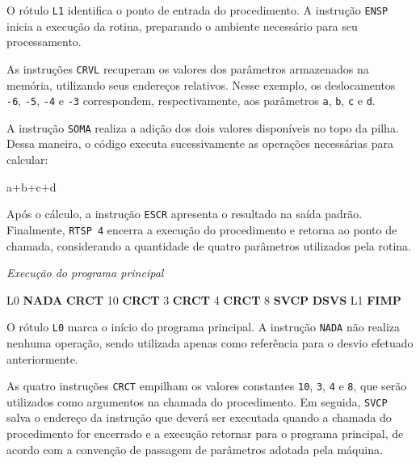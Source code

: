 \documentclass[
  brazilian,
  letterpaper,
]{book}
\newenvironment{Shaded}{\begin{snugshade}}{\end{snugshade}}
\newcommand{\DecValTok}[1]{\textcolor[rgb]{0.68,0.00,0.00}{#1}}
\newcommand{\FunctionTok}[1]{\textcolor[rgb]{0.28,0.35,0.67}{#1}}
\newcommand{\KeywordTok}[1]{\textcolor[rgb]{0.00,0.23,0.31}{\textbf{#1}}}
\newcommand{\NormalTok}[1]{\textcolor[rgb]{0.00,0.23,0.31}{#1}}
\theoremstyle{plain}
\theoremstyle{definition}
\theoremstyle{remark}
\begin{document}
O rótulo \texttt{L1} identifica o ponto de entrada do procedimento. A
instrução \texttt{ENSP} inicia a execução da rotina, preparando o
ambiente necessário para seu processamento.

As instruções \texttt{CRVL} recuperam os valores dos parâmetros
armazenados na memória, utilizando seus endereços relativos. Nesse
exemplo, os deslocamentos \texttt{-6}, \texttt{-5}, \texttt{-4} e
\texttt{-3} correspondem, respectivamente, aos parâmetros \texttt{a},
\texttt{b}, \texttt{c} e \texttt{d}.

A instrução \texttt{SOMA} realiza a adição dos dois valores disponíveis
no topo da pilha. Dessa maneira, o código executa sucessivamente as
operações necessárias para calcular:

\begin{Shaded}
\begin{Highlighting}[]
\NormalTok{a+b+c+d}
\end{Highlighting}
\end{Shaded}

Após o cálculo, a instrução \texttt{ESCR} apresenta o resultado na saída
padrão. Finalmente, \texttt{RTSP\ 4} encerra a execução do procedimento
e retorna ao ponto de chamada, considerando a quantidade de quatro
parâmetros utilizados pela rotina.

\emph{Execução do programa principal}

\begin{Shaded}
\begin{Highlighting}[]
\FunctionTok{L0}  \KeywordTok{NADA}
    \KeywordTok{CRCT}    \DecValTok{10}
    \KeywordTok{CRCT}    \DecValTok{3}
    \KeywordTok{CRCT}    \DecValTok{4}
    \KeywordTok{CRCT}    \DecValTok{8}
    \KeywordTok{SVCP}
    \KeywordTok{DSVS}    \FunctionTok{L1}
    \KeywordTok{FIMP}
\end{Highlighting}
\end{Shaded}

O rótulo \texttt{L0} marca o início do programa principal. A instrução
\texttt{NADA} não realiza nenhuma operação, sendo utilizada apenas como
referência para o desvio efetuado anteriormente.

As quatro instruções \texttt{CRCT} empilham os valores constantes
\texttt{10}, \texttt{3}, \texttt{4} e \texttt{8}, que serão utilizados
como argumentos na chamada do procedimento. Em seguida, \texttt{SVCP}
salva o endereço da instrução que deverá ser executada quando a chamada
do procedimento for encerrado e a execução retornar para o programa
principal, de acordo com a convenção de passagem de parâmetros adotada
pela máquina.
\end{document}
